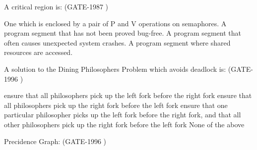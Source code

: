 
\begin{questyle}

  \question  A critical region is: (GATE-1987 )

  \begin{choices}
    \choice One which is enclosed by a pair of P and V operations on semaphores.
    \choice A program segment that has not been proved bug-free.
    \choice A program segment that often causes unexpected system crashes.
    \choice A program segment where shared resources are accessed.
  \end{choices}

  \end{questyle}




\begin{questyle}

  \question A solution to the Dining Philosophers Problem which avoids deadlock is: (GATE-1996 )

  \begin{choices}
    \choice ensure that all philosophers pick up the left fork before the right fork
    \choice ensure that all philosophers pick up the right fork before the left fork
    \choice ensure that one particular philosopher picks up the left fork before the right fork, and that all other philosophers pick up the right fork before the left fork
    \choice None of the above
  \end{choices}

  \end{questyle}




\begin{questyle}

  \question Precidence Graph: (GATE-1996 )
  \end{questyle}




